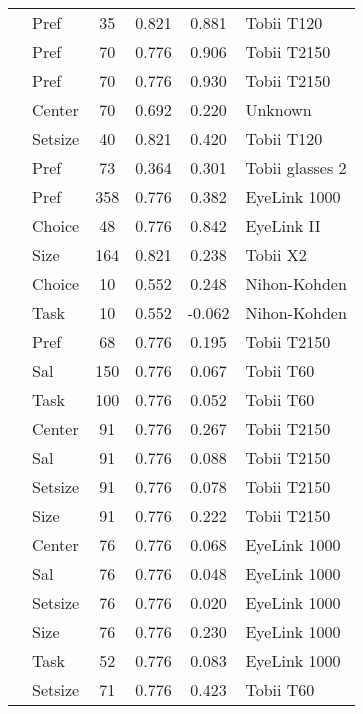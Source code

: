\begin{longtable}{p{8cm}lcccl}
  \cite{meissner2016a} & Pref & 35 & 0.821 & 0.881 & Tobii T120 \\ 
  \cite{meissner2016a} & Pref & 70 & 0.776 & 0.906 & Tobii T2150 \\ 
  \cite{meissner2016a} & Pref & 70 & 0.776 & 0.930 & Tobii T2150 \\ 
  \cite{meissner2016a} & Center & 70 & 0.692 & 0.220 & Unknown \\ 
  \cite{meissner2016b} & Setsize & 40 & 0.821 & 0.420 & Tobii T120 \\ 
  \cite{meyerding2018} & Pref & 73 & 0.364 & 0.301 & Tobii glasses 2 \\ 
  \cite{miller2015} & Pref & 358 & 0.776 & 0.382 & EyeLink 1000 \\ 
  \cite{mitsuda2014} & Choice & 48 & 0.776 & 0.842 & EyeLink II \\ 
  \cite{neuhofer2020} & Size & 164 & 0.821 & 0.238 & Tobii X2 \\ 
  \cite{nittono2009} & Choice & 10 & 0.552 & 0.248 & Nihon-Kohden \\ 
  \cite{nittono2009} & Task & 10 & 0.552 & -0.062 & Nihon-Kohden \\ 
  \cite{orquin2013} & Pref & 68 & 0.776 & 0.195 & Tobii T2150 \\ 
  \cite{orquin2015a} & Sal & 150 & 0.776 & 0.067 & Tobii T60 \\ 
  \cite{orquin2015a} & Task & 100 & 0.776 & 0.052 & Tobii T60 \\ 
  \cite{orquin2019a} & Center & 91 & 0.776 & 0.267 & Tobii T2150 \\ 
  \cite{orquin2019a} & Sal & 91 & 0.776 & 0.088 & Tobii T2150 \\ 
  \cite{orquin2019a} & Setsize & 91 & 0.776 & 0.078 & Tobii T2150 \\ 
  \cite{orquin2019a} & Size & 91 & 0.776 & 0.222 & Tobii T2150 \\ 
  \cite{orquin2019a} & Center & 76 & 0.776 & 0.068 & EyeLink 1000 \\ 
  \cite{orquin2019a} & Sal & 76 & 0.776 & 0.048 & EyeLink 1000 \\ 
  \cite{orquin2019a} & Setsize & 76 & 0.776 & 0.020 & EyeLink 1000 \\ 
  \cite{orquin2019a} & Size & 76 & 0.776 & 0.230 & EyeLink 1000 \\ 
  \cite{orquin2019a} & Task & 52 & 0.776 & 0.083 & EyeLink 1000 \\ 
  \cite{orquin2020osfb} & Setsize & 71 & 0.776 & 0.423 & Tobii T60 \\ 

\end{longtable}
